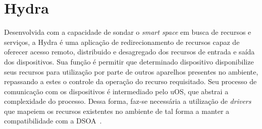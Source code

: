 \section{Hydra}
\label{sec:Hydra}

Desenvolvida com a capacidade de sondar o \emph{smart space} em busca de recursos e serviços, a Hydra é uma aplicação de redirecionamento de recursos capaz de oferecer acesso remoto, distribuido e desagregado dos recursos de entrada e saída dos dispositivos. Sua função é permitir que determinado dispositivo disponibilize seus recursos para utilização por parte de outros aparelhos presentes no ambiente, repassando a estes o controle da operação do recurso requisitado. Seu processo de comunicação com os dispositivos é intermediado pelo uOS, que abstrai a complexidade do processo. Dessa forma, faz-se necessária a utilização de \emph{drivers} que mapeiem os recursos existentes no ambiente de tal forma a manter a compatibilidade com a DSOA~\cite{lucas2011}.

\begin{comment}
A Hydra consiste em uma aplicação construída com o objetivo de explorar a forma como o ambiente é decomposto em recursos e serviços para possibilitar uma forma desagregada de acesso a recursos de entrada e saída dos dispositivos. Seu objetivo é permitir que um determinado dispositivo tenha seus recursos de entrada e saída redirecionados para outros dispositivos, repassando a estes o controle de sua operação.

A Hydra, trabalhando sobre o middleware uOS, percebe o ambiente como um conjunto
de recursos presentes. A comunicação entre a Hydra os recursos ocorre com intermédio do
uOS, abstraindo tanto da Hydra quando dos drivers o outro ponto de comunicação. Para
os drivers, não importa para quem estão sendo prestados os serviços, e cabe à aplicação
a escolha entre os recursos do ambiente.

Por trabalhar com os conceitos da DSOA (Seção 3.1), a Hydra vê os recursos do
ambiente de forma transparente, e pode fazer uso de qualquer recurso compatível com as
interfaces por ele esperadas e permite que outros dispositivos utilizem os mesmos recursos
do ambiente.

A aplicação Hydra se propõe a reconhecer determinados drivers e redirecionar seus
serviços corretamente.
\end{comment}